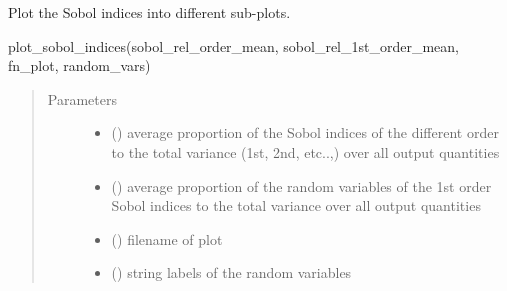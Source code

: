 \documentclass[letterpaper,10pt,english,openany,oneside]{sphinxmanual}
\begin{document}

\begin{fulllineitems}
\label{\detokenize{pygpc:pygpc.vis.plot_sobol_indices}}
Plot the Sobol indices into different sub-plots.

plot\_sobol\_indices(sobol\_rel\_order\_mean, sobol\_rel\_1st\_order\_mean, fn\_plot, random\_vars)
\begin{quote}\begin{description}
\item[{Parameters}] \leavevmode\begin{itemize}
\item {} 
 () \textendash{} average proportion of the Sobol indices of the different order to the total variance (1st, 2nd, etc..,)
over all output quantities

\item {} 
 () \textendash{} average proportion of the random variables of the 1st order Sobol indices to the total variance over all
output quantities

\item {} 
 () \textendash{} filename of plot

\item {} 
 (\sphinxstyleliteralemphasis{\sphinxupquote{{[}}}\sphinxstyleliteralemphasis{\sphinxupquote{{]} }}) \textendash{} string labels of the random variables

\end{itemize}

\end{description}\end{quote}

\end{fulllineitems}
\end{document}
